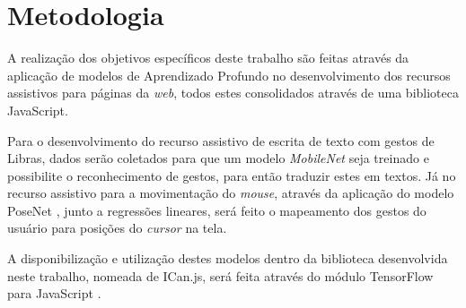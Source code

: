 \section{Metodologia} %

\par A realização dos objetivos específicos deste trabalho são feitas através da aplicação de modelos de Aprendizado Profundo no desenvolvimento dos recursos assistivos para páginas da \textit{web}, todos estes consolidados através de uma biblioteca JavaScript.

\par Para o desenvolvimento do recurso assistivo de escrita de texto com gestos de Libras, dados serão coletados para que um modelo \textit{MobileNet} \cite{howard2017mobilenets} seja treinado e possibilite o reconhecimento de gestos, para então traduzir estes em textos. Já no recurso assistivo para a movimentação do \textit{mouse}, através da aplicação do modelo PoseNet \cite{PoseNetMedium2019}, junto a regressões lineares, será feito o mapeamento dos gestos do usuário para posições do \textit{cursor} na tela.

\par A disponibilização e utilização destes modelos dentro da biblioteca desenvolvida neste trabalho, nomeada de ICan.js, será feita através do módulo TensorFlow para JavaScript \cite{tensorflowjs2019}.




